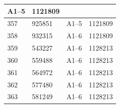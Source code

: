 \documentclass[UTF8,10pt,a4paper,fontset=fandol]{ctexart}
\newcommand{\fieldvalue}[1]{#1}
\begin{document}
\begin{center}
\begin{tabular}{|l|l|l|l|}
\fieldvalue{A1--5}&
\fieldvalue{1121809}\\
\hline
\fieldvalue{357}&
\fieldvalue{925851}&
\fieldvalue{A1--5}&
\fieldvalue{1121809}\\
\hline
\fieldvalue{358}&
\fieldvalue{932315}&
\fieldvalue{A1--6}&
\fieldvalue{1121809}\\
\hline
\fieldvalue{359}&
\fieldvalue{543227}&
\fieldvalue{A1--6}&
\fieldvalue{1128213}\\
\hline
\fieldvalue{360}&
\fieldvalue{559488}&
\fieldvalue{A1--6}&
\fieldvalue{1128213}\\
\hline
\fieldvalue{361}&
\fieldvalue{564972}&
\fieldvalue{A1--6}&
\fieldvalue{1128213}\\
\hline
\fieldvalue{362}&
\fieldvalue{577480}&
\fieldvalue{A1--6}&
\fieldvalue{1128213}\\
\hline
\fieldvalue{363}&
\fieldvalue{581249}&
\fieldvalue{A1--6}&
\fieldvalue{1128213}\\

\end{tabular}
\end{center}
\end{document}
